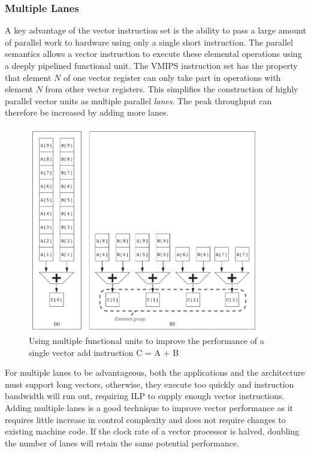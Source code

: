 \documentclass[11pt]{article}
\begin{document}
\subsubsection{Multiple Lanes}
A key advantage of the vector instruction set is the ability to pass a large amount of parallel work to hardware using only a single short instruction. The parallel semantics allows a vector instruction to execute these elemental operations using a deeply pipelined functional unit. 
\n
The VMIPS instruction set has the property that element $N$ of one vector register can only take part in operations with element $N$ from other vector registers. This simplifies the construction of highly parallel vector units as multiple parallel \textit{lanes}. The peak throughput can therefore be increased by adding more lanes. 
\begin{figure}[H]
\centering
\includegraphics[width=0.9\textwidth, keepaspectratio]{imgs/vector-multiple-lanes.png}
\caption{Using multiple functional units to improve the performance of a single vector add instruction C = A + B}
\end{figure}
\noindent
For multiple lanes to be advantageous, both the applications and the architecture must support long vectors, otherwise, they execute too quickly and instruction bandwidth will run out, requiring ILP to supply enough vector instructions. 
\n
Adding multiple lanes is a good technique to improve vector performance as it requires little increase in control complexity and does not require changes to existing machine code. If the clock rate of a vector processor is halved, doubling the number of lanes will retain the same potential performance. 
\end{document}
